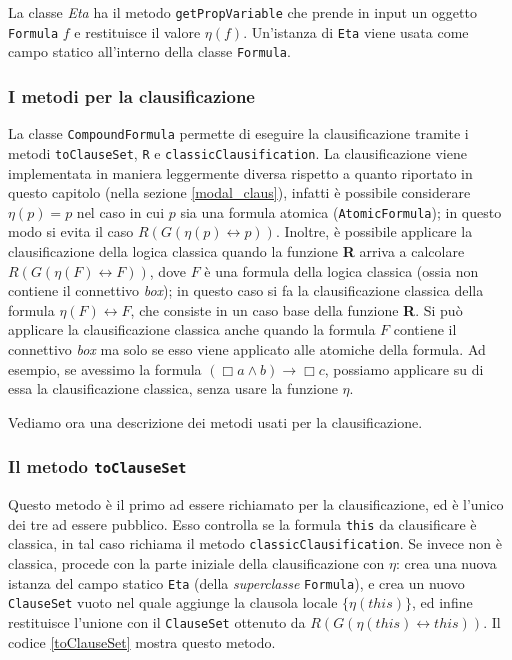 \documentclass[a4paper,12pt]{report}
\newcommand{\tto} {\leftrightarrow}
\begin{document}
La classe \emph{Eta} ha il metodo \texttt{getPropVariable} che prende in input un oggetto \texttt{Formula} $f$ e restituisce il valore $\eta(f)$. Un'istanza di \texttt{Eta} viene usata come campo statico all'interno della classe \texttt{Formula}.

\subsubsection{I metodi per la clausificazione}
La classe \texttt{CompoundFormula} permette di eseguire la clausificazione tramite i metodi \texttt{toClauseSet}, \texttt{R} e \texttt{classicClausification}. La clausificazione viene implementata in maniera leggermente diversa rispetto a quanto riportato in questo capitolo (nella sezione \ref{modal_claus}), infatti è possibile considerare $\eta(p) = p$ nel caso in cui $p$ sia una formula atomica (\texttt{AtomicFormula}); in questo modo si evita il caso $R(G(\eta(p) \tto p))$. Inoltre, è possibile applicare la clausificazione della logica classica quando la funzione \textbf{R} arriva a calcolare $R(G(\eta(F) \tto F))$, dove $F$ è una formula della logica classica (ossia non contiene il connettivo \emph{box}); in questo caso si fa la clausificazione classica della formula $\eta(F) \tto F$, che consiste in un caso base della funzione \textbf{R}. Si può applicare la clausificazione classica anche quando la formula $F$ contiene il connettivo \emph{box} ma solo se esso viene applicato alle atomiche della formula. Ad esempio, se avessimo la formula $(\Box a \land b) \to \Box c$, possiamo applicare su di essa la clausificazione classica, senza usare la funzione $\eta$.

Vediamo ora una descrizione dei metodi usati per la clausificazione.

\subsubsection{Il metodo \texttt{toClauseSet}}
Questo metodo è il primo ad essere richiamato per la clausificazione, ed è l'unico dei tre ad essere pubblico. Esso controlla se la formula \texttt{this} da clausificare è classica, in tal caso richiama il metodo \texttt{classicClausification}. Se invece non è classica, procede con la parte iniziale della clausificazione con $\eta$: crea una nuova istanza del campo statico \texttt{Eta} (della \emph{superclasse} \texttt{Formula}), e crea un nuovo \texttt{ClauseSet} vuoto nel quale aggiunge la clausola locale $\{\eta(this)\}$, ed infine restituisce l'unione con il \texttt{ClauseSet} ottenuto da $R(G(\eta(this) \tto this))$. Il codice \ref{toClauseSet} mostra questo metodo.
\end{document}
